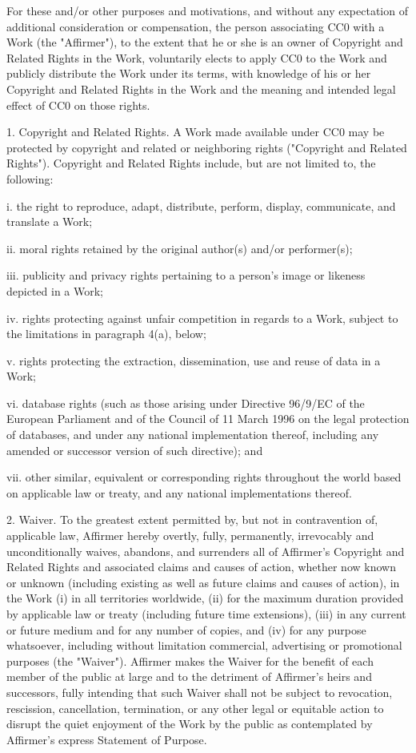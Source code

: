 \documentclass[10pt,letterpaper,twoside]{book}
\begin{document}
For these and/or other purposes and motivations, and without any expectation
of additional consideration or compensation, the person associating CC0 with a
Work (the "Affirmer"), to the extent that he or she is an owner of Copyright
and Related Rights in the Work, voluntarily elects to apply CC0 to the Work
and publicly distribute the Work under its terms, with knowledge of his or her
Copyright and Related Rights in the Work and the meaning and intended legal
effect of CC0 on those rights.

1. Copyright and Related Rights. A Work made available under CC0 may be
protected by copyright and related or neighboring rights ("Copyright and
Related Rights"). Copyright and Related Rights include, but are not limited
to, the following:

  i. the right to reproduce, adapt, distribute, perform, display, communicate,
  and translate a Work;

  ii. moral rights retained by the original author(s) and/or performer(s);

  iii. publicity and privacy rights pertaining to a person's image or likeness
  depicted in a Work;

  iv. rights protecting against unfair competition in regards to a Work,
  subject to the limitations in paragraph 4(a), below;

  v. rights protecting the extraction, dissemination, use and reuse of data in
  a Work;

  vi. database rights (such as those arising under Directive 96/9/EC of the
  European Parliament and of the Council of 11 March 1996 on the legal
  protection of databases, and under any national implementation thereof,
  including any amended or successor version of such directive); and

  vii. other similar, equivalent or corresponding rights throughout the world
  based on applicable law or treaty, and any national implementations thereof.

2. Waiver. To the greatest extent permitted by, but not in contravention of,
applicable law, Affirmer hereby overtly, fully, permanently, irrevocably and
unconditionally waives, abandons, and surrenders all of Affirmer's Copyright
and Related Rights and associated claims and causes of action, whether now
known or unknown (including existing as well as future claims and causes of
action), in the Work (i) in all territories worldwide, (ii) for the maximum
duration provided by applicable law or treaty (including future time
extensions), (iii) in any current or future medium and for any number of
copies, and (iv) for any purpose whatsoever, including without limitation
commercial, advertising or promotional purposes (the "Waiver"). Affirmer makes
the Waiver for the benefit of each member of the public at large and to the
detriment of Affirmer's heirs and successors, fully intending that such Waiver
shall not be subject to revocation, rescission, cancellation, termination, or
any other legal or equitable action to disrupt the quiet enjoyment of the Work
by the public as contemplated by Affirmer's express Statement of Purpose.
\end{document}
